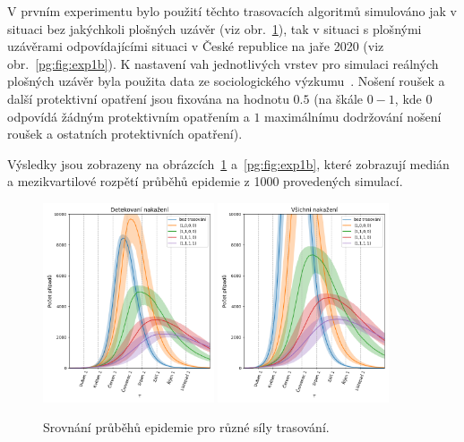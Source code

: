V prvním experimentu bylo použití těchto trasovacích algoritmů
simulováno jak v situaci bez jakýchkoli plošných uzávěr (viz
obr.~\ref{pg:fig:exp1a}), tak v situaci s plošnými uzávěrami
odpovídajícími situaci v České republice na jaře 2020 (viz
obr.~\ref{pg:fig:exp1b}). K nastavení vah jednotlivých vrstev pro
simulaci reálných plošných uzávěr byla použita data ze sociologického
výzkumu~\cite{pg:paqcovid}. Nošení roušek a další protektivní opatření
jsou fixována na hodnotu $0.5$ (na škále $0 - 1$, kde $0$ odpovídá
žádným protektivním opatřením a $1$ maximálnímu dodržování nošení
roušek a ostatních protektivních opatření).

Výsledky jsou zobrazeny na obrázcích~\ref{pg:fig:exp1a}
a~\ref{pg:fig:exp1b}, které zobrazují medián a mezikvartilové rozpětí
průběhů epidemie z 1000 provedených simulací.



\begin{figure}[ht!]
  \centering
  \includegraphics[width=0.45\textwidth]{pic/history_second_exp_detected_iqr.png}
  \includegraphics[width=0.45\textwidth]{pic/history_second_exp_all_iqr.png}
  \caption{Srovnání průběhů epidemie pro různé síly trasování.}
  \label{pg:fig:exp1a}
\end{figure}

